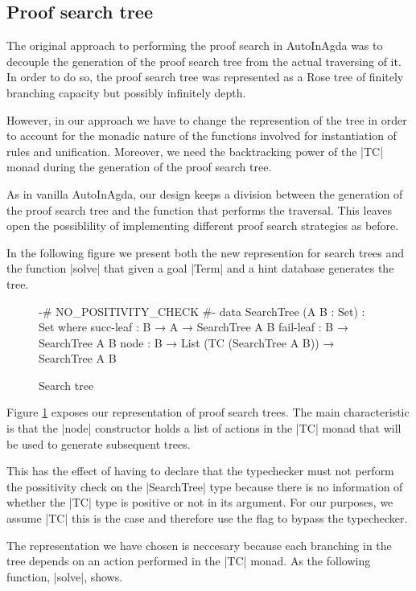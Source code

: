 \documentclass[a4paper]{article}
\begin{document}
\subsection{Proof search tree}

The original approach to performing the proof search in AutoInAgda was to
decouple the generation of the proof search tree from the actual traversing of
it. In order to do so, the proof search tree was represented as a Rose tree of
finitely branching capacity but possibly infinitely depth.

However, in our approach we have to change the represention of the tree in order
to account for the monadic nature of the functions involved for instantiation of
rules and unification. Moreover, we need the backtracking power of the |TC| monad
during the generation of the proof search tree.

As in vanilla AutoInAgda, our design keeps a division between the generation of
the proof search tree and the function that performs the traversal. This leaves
open the possiblility of implementing different proof search strategies as
before.



In the following figure we present both the new represention for search trees
and the function |solve| that given a goal |Term| and a hint database generates
the tree.

\begin{figure}[h]
\small
\begin{code}
  {-# NO\_POSITIVITY\_CHECK #-}
  data SearchTree (A B : Set) : Set where
    succ-leaf : B → A → SearchTree A B
    fail-leaf : B → SearchTree A B
    node      : B → List (TC (SearchTree A B)) → SearchTree A B
\end{code}
  \label{fig:tree}
  \caption{Search tree}
\end{figure}

Figure \ref{fig:tree} exposes our representation of proof search trees. The main
characteristic is that the |node| constructor holds a list of actions in the
|TC| monad that will be used to generate subsequent trees.

This has the effect of having to declare that the typechecker must not perform
the possitivity check on the |SearchTree| type because there is no information
of whether the |TC| type is positive or not in its argument. For our purposes, we
assume |TC| this is the case and therefore use the flag to bypass the typechecker.

The representation we have chosen is neccesary because each branching in the
tree depends on an action performed in the |TC| monad. As the following
function, |solve|, shows.
\end{document}
